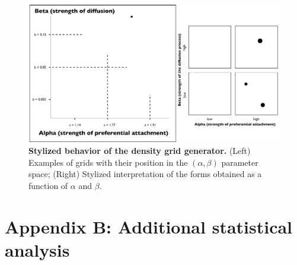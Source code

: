 \documentclass{JASSS}
\begin{document}
\begin{figure}[!t]
	\centering
    \includegraphics[width=\textwidth]{figures/Fig7.png}
    \caption{\textbf{Stylized behavior of the density grid generator.} (Left) Examples of grids with their position in the $(\alpha,\beta)$ parameter space; (Right) Stylized interpretation of the forms obtained as a function of $\alpha$ and $\beta$.}\label{fig:stylized-generator}
\end{figure}


\section{Appendix B: Additional statistical analysis}

\label{app:convergence}





\end{document}
